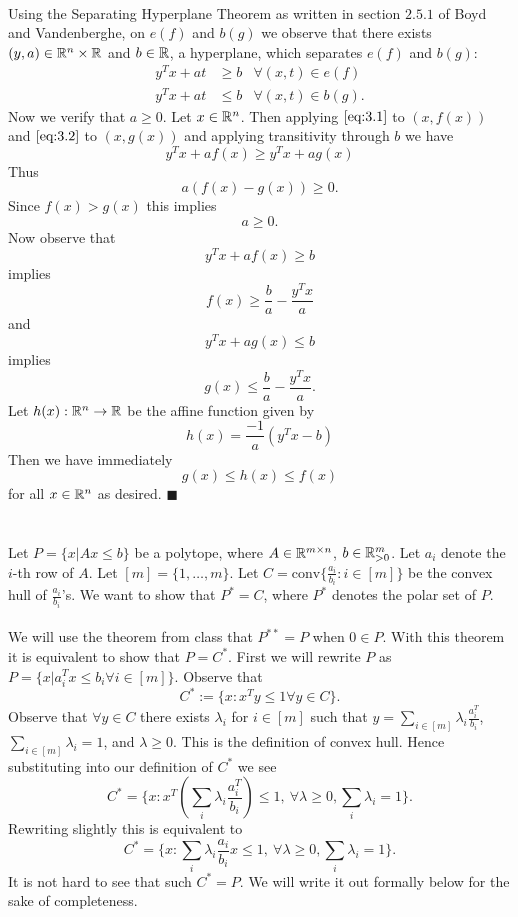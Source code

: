 \documentclass[letterpaper,12pt,oneside,onecolumn]{article}
\begin{document}
\paragraph{}
Using the Separating Hyperplane Theorem as written in section $2.5.1$ of Boyd and Vandenberghe, on $e(f)$ and $b(g)$ we observe that there exists $(y,a) \in \mathbb{R}^n \times \mathbb{R}$ and $b \in \mathbb{R}$, a hyperplane, which separates $e(f)$ and $b(g)$:
\begin{align}
y^Tx + at &\geq b &\forall (x,t) \in e(f) \label{eq:3.1}\\
y^Tx + at &\leq b &\forall (x,t) \in b(g) \label{eq:3.2}.
\end{align}
Now we verify that $a\geq 0$. Let $x \in \mathbb{R}^n$. Then applying $\ref{eq:3.1}$ to $(x,f(x))$ and $\ref{eq:3.2}$ to $(x,g(x))$ and applying transitivity through $b$ we have
$$y^Tx + af(x) \geq y^Tx + ag(x)$$
Thus
$$a(f(x) - g(x)) \geq 0.$$
Since $f(x) > g(x)$ this implies
$$a \geq 0.$$
Now observe that
$$y^Tx + af(x) \geq b$$
implies
$$ f(x) \geq \frac{b}{a} - \frac{y^Tx}{a}$$
and
$$ y^Tx + ag(x) \leq b$$
implies 
$$g(x) \leq \frac{b}{a} - \frac{y^Tx}{a}.$$
Let $h(x): \mathbb{R}^n \rightarrow \mathbb{R}$ be the affine function given by
$$h(x) =\frac{-1}{a}(y^Tx - b)$$
Then we have immediately
$$g(x) \leq h(x) \leq f(x)$$
for all $x \in \mathbb{R}^n$ as desired. $\blacksquare$

\section{}
\paragraph{}
Let $P = \{ x| Ax \leq b\}$ be a polytope, where $A \in \mathbb{R}^{m\times n}$, $b \in \mathbb{R}^m_{>0}$. Let $a_i$ denote the $i$-th row of $A$. Let $[m] = \{1,\dots, m\}$. Let $C = \text{conv} \{\frac{a_i}{b_i} : i\in [m]\}$ be the convex hull of $\frac{a_i}{b_i}$'s. We want to show that $P^* = C$, where $P^*$ denotes the polar set of $P$.
\paragraph{}
We will use the theorem from class that $P^{**} = P$ when $0 \in P$. With this theorem it is equivalent to show that $P = C^*$. First we will rewrite $P$ as $P = \{x| a_i^Tx \leq b_i \forall i\in[m]\}$. Observe that 
$$C^* := \{ x: x^Ty \leq 1\forall y \in C\}.$$
Observe that $\forall y \in C$ there exists $\lambda_i$ for $i\in [m]$ such that $y = \sum_{i\in[m]} \lambda_i \frac{a_i^T}{b_i}$, $\sum_{i\in [m]}\lambda_i = 1$, and $\lambda \geq 0$. This is the definition of convex hull. Hence substituting into our definition of $C^*$ we see
$$C^* = \{x : x^T(\sum_{i} \lambda_i \frac{a_i^T}{b_i}) \leq 1,\ \forall \lambda \geq 0, \sum_i \lambda_i = 1\}.$$
Rewriting slightly this is equivalent to
$$C^* = \{x : \sum_{i}\lambda_i \frac{a_i}{b_i}x \leq 1,\ \forall \lambda \geq 0, \sum_i\lambda_i = 1\}.$$
It is not hard to see that such $C^* = P$. We will write it out formally below for the sake of completeness.
\end{document}

